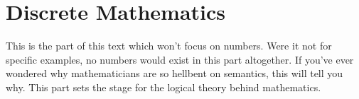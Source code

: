 
\part{Discrete Mathematics} %
\thispagestyle{empty}
This is the part of this text which won't focus on numbers.
Were it not for specific examples, no numbers would exist in this part altogether.
If you've ever wondered why mathematicians are so hellbent on semantics, this will tell you why.
This part sets the stage for the logical theory behind mathematics.
\setcounter{section}{0}





%

